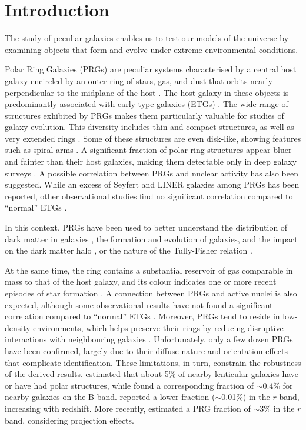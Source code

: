 \documentclass[fleqn,usenatbib]{mnras}
\begin{document}
\section{Introduction}
%
The study of peculiar galaxies enables us to test our models of the universe by examining objects that form and evolve under extreme environmental conditions.
{Polar Ring Galaxies (PRGs) are peculiar systems characterised by a central host galaxy encircled by an outer ring of stars, gas, and dust that orbits nearly perpendicular to the midplane of the host \citep{1990_Whitmore}. The host galaxy in these objects is predominantly associated with early-type galaxies (ETGs) \citep{1995_Arnaboldi,2002I_Iodice,Reshetnikov_2015}.
The wide range of structures exhibited by PRGs makes them particularly valuable for studies of galaxy evolution. This diversity includes thin and compact structures, as well as very extended rings \citep{1997_Reshetnikov, 2012_Finkelman, 2016_Ordenes-Briceno}. Some of these structures are even disk-like, showing features such as spiral arms \citep[e.g., NGC4650A;][]{1997_Reshetnikov,2002c_Iodice, 2002_Gallagher, 2006_Iodice}. A significant fraction of polar ring structures appear bluer and fainter than their host galaxies, making them detectable only in deep galaxy surveys \citep{Reshetnikov_2015, 2024_Mosenkov}. A possible correlation between PRGs and nuclear activity has also been suggested. While an excess of Seyfert and LINER galaxies among PRGs has been reported, other observational studies find no significant correlation compared to ``normal'' ETGs \citep{2001_Reshetnikov,2012_Finkelman, 2020_Smirnov}.

In this context, PRGs have been used to better understand the distribution of dark matter in galaxies \citep{2012_Snaith,2014_Khoperskov}, the formation and evolution of galaxies, and the impact on the dark matter halo \citep{2006_Maccio}, or the nature of the Tully-Fisher relation \citep{2003_Iodice}.}
{At the same time, the ring contains a substantial reservoir of gas comparable in mass to that of the host galaxy, and its colour indicates one or more recent episodes of star formation \citep{1997_Galletta,2002_Iodice,Reshetnikov_2015,2024_Mosenkov}. A connection between PRGs and active nuclei is also expected, although some observational results have not found a significant correlation compared to ``normal'' ETGs \citep{2001_Reshetnikov,2012_Finkelman}. Moreover, PRGs tend to reside in low-density environments, which helps preserve their rings by reducing disruptive interactions with neighbouring galaxies \citep{2012_Finkelman,2017_Savchenko, 2020_Smirnov}. Unfortunately, only a few dozen PRGs have been confirmed, largely due to their diffuse nature and orientation effects that complicate identification. These limitations, in turn, constrain the robustness of the derived results. \citet{1990_Whitmore} estimated that about 5\% of nearby lenticular galaxies have or have had polar structures, while \citet{2011_Reshetnikov} found a corresponding fraction of $\sim$0.4\% for nearby galaxies on the B band. \citet{2022_Smirnov} reported a lower fraction ($\sim$0.01\%) in the $r$ band, increasing with redshift. More recently, \citet{2024_Mosenkov} estimated a PRG fraction of $\sim$3\% in the $r$ band, considering projection effects.
}  
\end{document}
